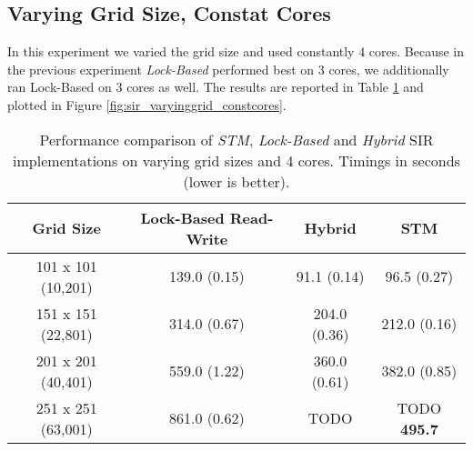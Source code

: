 
\subsection{Varying Grid Size, Constat Cores}
In this experiment we varied the grid size and used constantly 4 cores. Because in the previous experiment \textit{Lock-Based} performed best on 3 cores, we additionally ran Lock-Based on 3 cores as well. %
The results are reported in Table \ref{tab:sir_varyinggrid_constcores} and plotted in Figure \ref{fig:sir_varyinggrid_constcores}.

\begin{table}
	\centering
  	\begin{tabular}{ c || c | c | c  }
        Grid Size          &  Lock-Based Read-Write & Hybrid       & STM                   \\ \hline \hline 
   		101 x 101 (10,201) &  139.0 (0.15)          & 91.1 (0.14)  & 96.5 (0.27)           \\ \hline
   		151 x 151 (22,801) &  314.0 (0.67)          & 204.0 (0.36) & 212.0 (0.16)          \\ \hline
   		201 x 201 (40,401) &  559.0 (1.22)          & 360.0 (0.61) & 382.0 (0.85)          \\ \hline
   		251 x 251 (63,001) &  861.0 (0.62)          & TODO         & TODO \textbf{495.7}   \\ \hline \hline
  	\end{tabular}

  	\caption{Performance comparison of \textit{STM}, \textit{Lock-Based} and \textit{Hybrid} SIR implementations on varying grid sizes and 4 cores. Timings in seconds (lower is better).}
	\label{tab:sir_varyinggrid_constcores}
\end{table}

